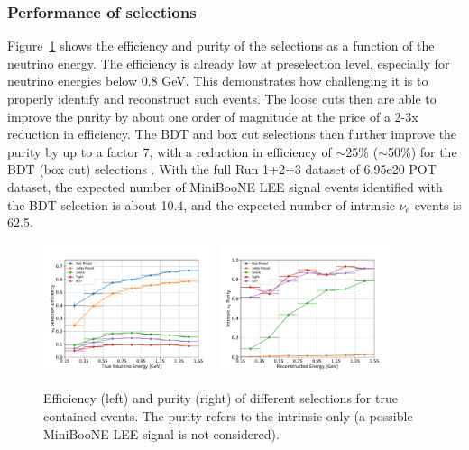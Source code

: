 \subsubsection{Performance of \npsel selections}

Figure~\ref{fig:1eNp:effpur:RUN3} shows the efficiency and purity of the \npsel selections as a function of the neutrino energy. The efficiency is already low at preselection level, especially for neutrino energies below 0.8 \si{\GeV}. This demonstrates how challenging it is to properly identify and reconstruct such events. The loose cuts then are able to improve the purity by about one order of magnitude at the price of a 2-3x reduction in efficiency. The BDT and box cut selections then further improve the purity by up to a factor 7, with a reduction in efficiency of $\sim$25\% ($\sim$50\%) for the BDT (box cut) selections . With the full Run 1+2+3 dataset of  6.95e20 POT dataset, the expected number of MiniBooNE LEE signal events identified with the BDT selection is about 10.4, and the expected number of intrinsic $\nu_e$ events is 62.5.

\begin{figure}[H]
\begin{center}
\includegraphics[width=0.45\textwidth]{1eNp/eff_1eNp_cut_bdt.pdf}
\includegraphics[width=0.45\textwidth]{1eNp/pur_1eNp_cut_bdt.pdf}
\caption{\label{fig:1eNp:effpur:RUN3} Efficiency (left) and purity (right) of different selections for true contained \npsel events. The purity refers to the intrinsic \npsel only (a possible MiniBooNE LEE signal is not considered).}
\end{center}
\end{figure}

